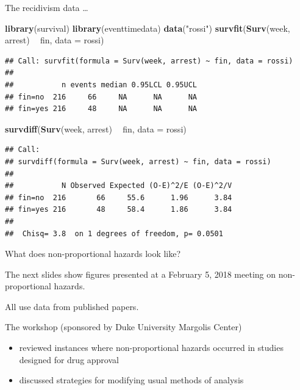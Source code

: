 \documentclass[ignorenonframetext,]{beamer}
\newenvironment{Shaded}{\begin{snugshade}}{\end{snugshade}}
\newcommand{\DataTypeTok}[1]{\textcolor[rgb]{0.13,0.29,0.53}{#1}}
\newcommand{\KeywordTok}[1]{\textcolor[rgb]{0.13,0.29,0.53}{\textbf{#1}}}
\newcommand{\NormalTok}[1]{#1}
\newcommand{\OperatorTok}[1]{\textcolor[rgb]{0.81,0.36,0.00}{\textbf{#1}}}
\newcommand{\StringTok}[1]{\textcolor[rgb]{0.31,0.60,0.02}{#1}}
\begin{document}
\begin{frame}[fragile]{%
\protect\hypertarget{the-recidivism-data-1}{%
The recidivism data \ldots}}

\scriptsize

\begin{Shaded}
\begin{Highlighting}[]
\KeywordTok{library}\NormalTok{(survival)}
\KeywordTok{library}\NormalTok{(eventtimedata)}
\KeywordTok{data}\NormalTok{(}\StringTok{"rossi"}\NormalTok{)}
\KeywordTok{survfit}\NormalTok{(}\KeywordTok{Surv}\NormalTok{(week, arrest) }\OperatorTok{~}\StringTok{ }\NormalTok{fin, }
                        \DataTypeTok{data =}\NormalTok{ rossi)}
\end{Highlighting}
\end{Shaded}

\begin{verbatim}
## Call: survfit(formula = Surv(week, arrest) ~ fin, data = rossi)
## 
##           n events median 0.95LCL 0.95UCL
## fin=no  216     66     NA      NA      NA
## fin=yes 216     48     NA      NA      NA
\end{verbatim}

\begin{Shaded}
\begin{Highlighting}[]
\KeywordTok{survdiff}\NormalTok{(}\KeywordTok{Surv}\NormalTok{(week, arrest) }\OperatorTok{~}\StringTok{ }\NormalTok{fin, }
                        \DataTypeTok{data =}\NormalTok{ rossi)}
\end{Highlighting}
\end{Shaded}

\begin{verbatim}
## Call:
## survdiff(formula = Surv(week, arrest) ~ fin, data = rossi)
## 
##           N Observed Expected (O-E)^2/E (O-E)^2/V
## fin=no  216       66     55.6      1.96      3.84
## fin=yes 216       48     58.4      1.86      3.84
## 
##  Chisq= 3.8  on 1 degrees of freedom, p= 0.0501
\end{verbatim}

\end{frame}

\begin{frame}{%
\protect\hypertarget{what-does-non-proportional-hazards-look-like}{%
What does non-proportional hazards look like?}}

The next slides show figures presented at a February 5, 2018 meeting on
non-proportional hazards.

All use data from published papers.

The workshop (sponsored by Duke University Margolis Center)

\begin{itemize}
\item
  reviewed instances where non-proportional hazards occurred in studies
  designed for drug approval
\item
  discussed strategies for modifying usual methods of analysis
\end{itemize}

\end{frame}
\end{document}

